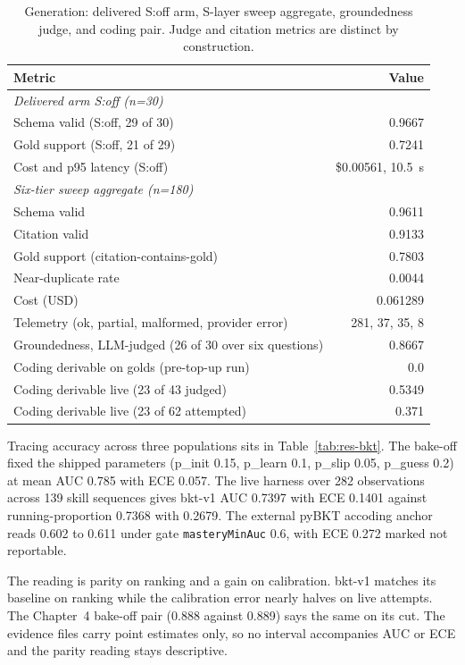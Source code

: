 \begin{table}[htbp]
\centering
\footnotesize
\caption{Generation: delivered S:off arm, S-layer sweep aggregate, groundedness judge, and coding pair. Judge and citation metrics are distinct by construction.}
\label{tab:res-generation}
\begin{tabular}{p{6.4cm} r}
\toprule
\textbf{Metric} & \textbf{Value} \\
\midrule
\multicolumn{2}{l}{\textit{Delivered arm S:off (n=30)}} \\
Schema valid (S:off, 29 of 30) & 0.9667 \\
Gold support (S:off, 21 of 29) & 0.7241 \\
Cost and p95 latency (S:off) & \$0.00561, 10.5~s \\
\midrule
\multicolumn{2}{l}{\textit{Six-tier sweep aggregate (n=180)}} \\
Schema valid & 0.9611 \\
Citation valid & 0.9133 \\
Gold support (citation-contains-gold) & 0.7803 \\
Near-duplicate rate & 0.0044 \\
Cost (USD) & 0.061289 \\
Telemetry (ok, partial, malformed, provider error) & 281, 37, 35, 8 \\
Groundedness, LLM-judged (26 of 30 over six questions) & 0.8667 \\
 Coding derivable on golds (pre-top-up run) & 0.0 \\
Coding derivable live (23 of 43 judged) & 0.5349 \\
Coding derivable live (23 of 62 attempted) & 0.371 \\
\bottomrule
\end{tabular}
\end{table}

Tracing accuracy across three populations sits in Table~\ref{tab:res-bkt}. The bake-off fixed the shipped parameters (p\_init 0.15, p\_learn 0.1, p\_slip 0.05, p\_guess 0.2) at mean AUC 0.785 with ECE 0.057. The live harness over 282 observations across 139 skill sequences gives bkt-v1 AUC 0.7397 with ECE 0.1401 against running-proportion 0.7368 with 0.2679. The external pyBKT accoding anchor reads 0.602 to 0.611 under gate \texttt{masteryMinAuc} 0.6, with ECE 0.272 marked not reportable.

The reading is parity on ranking and a gain on calibration. bkt-v1 matches its baseline on ranking while the calibration error nearly halves on live attempts. The Chapter~4 bake-off pair (0.888 against 0.889) says the same on its cut. The evidence files carry point estimates only, so no interval accompanies AUC or ECE and the parity reading stays descriptive.

